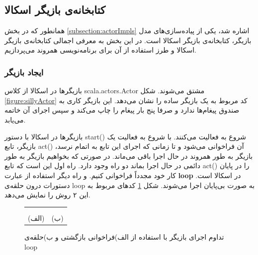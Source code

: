 \subsection{کتابخانه‌ی بازیگر اسکالا}
همانطور که در بخش \ref{subsection:actorImpls} اشاره شد، یکی از پیاده‌سازی‌های مدل بازیگر، کتابخانه‌ی بازیگر اسکالا است. در این بخش به معرفی اجمالی کتابخانه‌ی بازیگر اسکالا و طرز استفاده از آن برای برنامه‌نویسی همروند می‌پردازیم.
\subsubsection{ایجاد بازیگر}
بازیگر‌ها در اسکالا از کلاس scala.actors.Actor مشتق می‌شوند.  شکل \ref{figure:sillyActor} کد مربوط به  یک بازیگر ساده را نشان می‌دهد. این بازیگر کاری به صندوق پیغام‌ها ندارد و صرفا پنج بار پیغام  را چاپ می‌کند و سپس اجرای آن خاتمه می‌یابد.


  بازیگر‌ها در اسکالا با دستور start() شروع به فعالیت می‌کنند. با شروع به فعالیت یک بازیگر، تابع act() آن فراخوانی می‌شود و تا زمانی که اجرای این تابع به اتمام نرسد، بازیگر به طور همروند در حال اجرا باقی می‌ماند. در صورتی که بخواهیم بازیگر به طور دائمی در حال اجرا بماند دو راه وجود دارد. راه اول این است که تابع act() را در پایان کار  خود مجدداً فراخوانی کنیم. و راه دیگر استفاده از عبارت \textbf{loop} در اسکالا است. دستورات درون حلقه‌ی loop به صورت بی‌پایان اجرا می‌شوند. شکل \ref{fig:endlessActor} کدهای مربوط به این ۲ روش را نمایش می‌دهد.

\begin{figure}
    \begin{center}
    \begin{tabular}{ c  c }
	 & \\

	\begin{latin}
\linespread{1.1}

\end{latin} & 
 \begin{latin}
	\linespread{1.1}
	
\end{latin}
 	\\
         (الف) & (ب) \\
    \end{tabular}
    \end{center}
    \caption{\label{fig:endlessActor} تداوم اجرای بازیگر با استفاده از الف)فراخوانی بازگشتی و ب)حلقه‌ی loop}
\end{figure}


